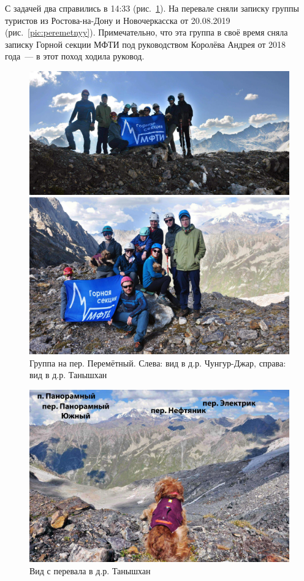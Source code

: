 С задачей два справились в 14:33 (рис.~\ref{fig:DSC_0412}). На перевале сняли записку группы туристов из Ростова-на-Дону и Новочеркасска от 20.08.2019 (рис.~\ref{pic:peremetnyy}). Примечательно, что эта группа в своё время сняла записку Горной секции МФТИ под руководством Королёва Андрея от 2018 года~--- в этот поход ходила руковод.
\begin{figure}[h!]
	\centering
	\begin{minipage}[h]{0.55\linewidth}
		\includegraphics[width=0.99\linewidth]{../pics/DSC_0412 2.jpg}
	\end{minipage}
	\hfill
	\begin{minipage}[h]{0.45\linewidth}
		\includegraphics[width=0.99\linewidth]{../pics/DSC_0419 2.jpg}
	\end{minipage}
	\caption{Группа на пер. Перемётный. Слева: вид в д.р. Чунгур-Джар, справа: вид в д.р. Танышхан}
	\label{fig:DSC_0412}
\end{figure}
\begin{figure}[h!]
	\centering
	\includegraphics[width=0.7\linewidth]{../pics/DSC_0385 2.jpg}
	\caption{Вид с перевала в д.р. Танышхан}
	\label{fig:DSC_0385 2}
\end{figure} 

